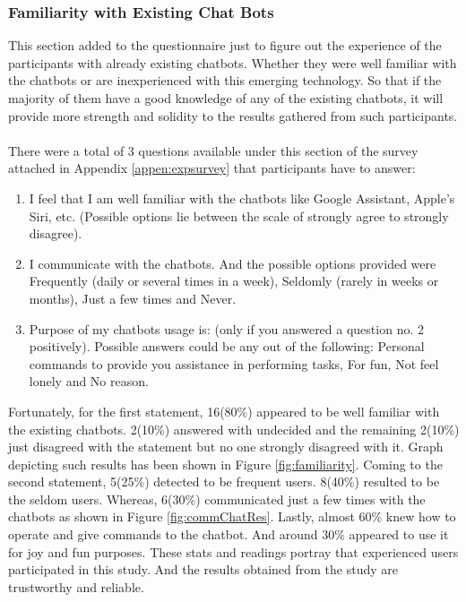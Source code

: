\subsubsection*{Familiarity with Existing Chat Bots}
This section added to the questionnaire just to figure out the experience of the participants with already existing chatbots. Whether they were well familiar with the chatbots or are inexperienced with this emerging technology. So that if the majority of them have a good knowledge of any of the existing chatbots, it will provide more strength and solidity to the results gathered from such participants.
\\~\\
There were a total of 3 questions available under this section of the survey attached in Appendix \ref{appen:expsurvey} that participants have to answer:
\begin{enumerate}
    \item I feel that I am well familiar with the chatbots like Google Assistant, Apple's Siri, etc. (Possible options lie between the scale of strongly agree to strongly disagree).
    \item I communicate with the chatbots. And the possible options provided were Frequently (daily or several times in a week), Seldomly (rarely in weeks or months), Just a few times and Never.
    \item Purpose of my chatbots usage is: (only if you answered a question no. 2 positively). Possible answers could be any out of the following: Personal commands to provide you assistance in performing tasks, For fun, Not feel lonely and No reason.
\end{enumerate}
Fortunately, for the first statement, 16(80\%) appeared to be well familiar with the existing chatbots. 2(10\%) answered with undecided and the remaining 2(10\%) just disagreed with the statement but no one strongly disagreed with it. Graph depicting such results has been shown in Figure \ref{fig:familiarity}. Coming to the second statement, 5(25\%) detected to be frequent users. 8(40\%) resulted to be the seldom users. Whereas, 6(30\%) communicated just a few times with the chatbots as shown in Figure \ref{fig:commChatRes}. Lastly, almost 60\% knew how to operate and give commands to the chatbot. And around 30\% appeared to use it for joy and fun purposes. These stats and readings portray that experienced users participated in this study. And the results obtained from the study are trustworthy and reliable. 

